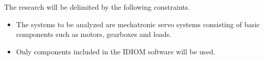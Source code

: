 The research will be delimited by the following constraints.
\begin{itemize}[itemsep=0pt, topsep=3pt, partopsep=3pt]
\item The systems to be analyzed are mechatronic servo systems consisting of basic components such as motors, gearboxes and loads.
\item Only components included in the IDIOM software will be used. 
\end{itemize}


